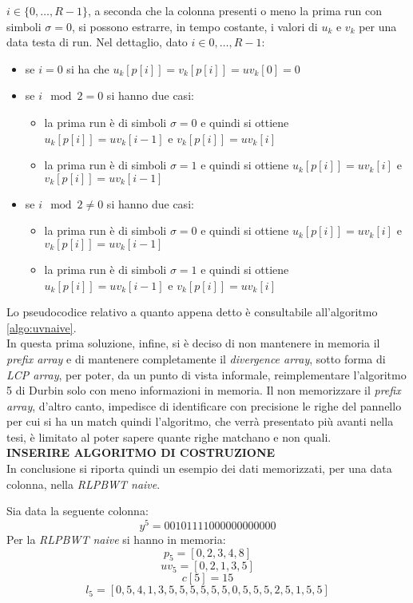 $i\in\{0,\ldots, R-1\}$, a seconda che la colonna presenti o meno la prima run
con simboli $\sigma=0$, si possono estrarre, in tempo costante, i valori di
$u_k$ e $v_k$ per una data testa di run. Nel dettaglio, dato $i\in{0,\ldots,
  R-1}$:
\begin{itemize}
  \item se $i=0$ si ha che $u_k[p[i]]=v_k[p[i]]=uv_k[0]=0$
  \item se $i\mod 2 =0$ si hanno due casi:
  \begin{itemize}
    \item la prima run è di simboli $\sigma=0$ e quindi si ottiene
    $u_k[p[i]]=uv_k[i-1]$ e $v_k[p[i]]=uv_k[i]$
    \item la prima run è di simboli $\sigma=1$ e quindi si ottiene
    $u_k[p[i]]=uv_k[i]$ e $v_k[p[i]]=uv_k[i-1]$
  \end{itemize}
  \item se $i\mod 2 \neq 0$ si hanno due casi:
  \begin{itemize}
    \item la prima run è di simboli $\sigma=0$ e quindi si ottiene
    $u_k[p[i]]=uv_k[i]$ e $v_k[p[i]]=uv_k[i-1]$
    \item la prima run è di simboli $\sigma=1$ e quindi si ottiene
    $u_k[p[i]]=uv_k[i-1]$ e $v_k[p[i]]=uv_k[i]$   
  \end{itemize}
\end{itemize}
Lo pseudocodice relativo a quanto appena detto è consultabile all'algoritmo
\ref{algo:uvnaive}.\\
In questa prima soluzione, infine, si è deciso di non mantenere in memoria il
\textit{prefix array} e di mantenere completamente il \textit{divergence
  array}, sotto forma di \textit{LCP array}, per poter, da un punto di vista
informale, reimplementare l'algoritmo 
5 di Durbin solo con meno informazioni in memoria. Il non memorizzare il
\textit{prefix array}, d'altro canto, impedisce di identificare con precisione
le righe del pannello per cui si ha un match quindi l'algoritmo, che verrà
presentato più avanti nella tesi, è limitato al poter sapere quante righe
matchano e non quali.\\
\textbf{INSERIRE ALGORITMO DI COSTRUZIONE}\\
In conclusione si riporta quindi un esempio dei dati memorizzati, per una data
colonna, nella \textit{RLPBWT naive}.
\begin{esempio}
  Sia data la seguente colonna:
  \[y^5=00101111000000000000\]
  Per la \textit{RLPBWT naive} si hanno in memoria:
  \[p_5=[0,2,3,4,8]\]
  \[uv_5=[0,2,1,3,5]\]
  \[c[5]=15\]
  \[l_5=[0,5,4,1,3,5,5,5,5,5,5,0,5,5,5,2,5,1,5,5]\]
\end{esempio}
